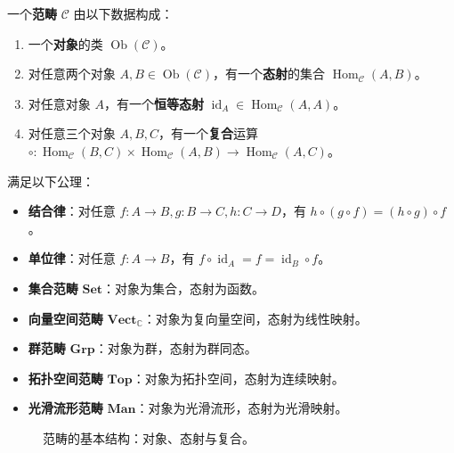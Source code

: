 \begin{definition}[范畴]\label{def:category}
一个\textbf{范畴} $\mathcal{C}$ 由以下数据构成：
\begin{enumerate}[label=(\roman*)]
    \item 一个\textbf{对象}的类 $\operatorname{Ob}(\mathcal{C})$。
    \item 对任意两个对象 $A, B \in \operatorname{Ob}(\mathcal{C})$，有一个\textbf{态射}的集合 $\operatorname{Hom}_{\mathcal{C}}(A, B)$。
    \item 对任意对象 $A$，有一个\textbf{恒等态射} $\operatorname{id}_A \in \operatorname{Hom}_{\mathcal{C}}(A, A)$。
    \item 对任意三个对象 $A, B, C$，有一个\textbf{复合}运算 $\circ: \operatorname{Hom}_{\mathcal{C}}(B, C) \times \operatorname{Hom}_{\mathcal{C}}(A, B) \to \operatorname{Hom}_{\mathcal{C}}(A, C)$。
\end{enumerate}
满足以下公理：
\begin{itemize}
    \item \textbf{结合律}：对任意 $f: A \to B, g: B \to C, h: C \to D$，有 $h \circ (g \circ f) = (h \circ g) \circ f$。
    \item \textbf{单位律}：对任意 $f: A \to B$，有 $f \circ \operatorname{id}_A = f = \operatorname{id}_B \circ f$。
\end{itemize}
\end{definition}

\begin{example}[周期数学中的范畴实例]\label{ex:category_instances}
\begin{itemize}
    \item \textbf{集合范畴} $\mathbf{Set}$：对象为集合，态射为函数。
    \item \textbf{向量空间范畴} $\mathbf{Vect}_{\mathbb{C}}$：对象为复向量空间，态射为线性映射。
    \item \textbf{群范畴} $\mathbf{Grp}$：对象为群，态射为群同态。
    \item \textbf{拓扑空间范畴} $\mathbf{Top}$：对象为拓扑空间，态射为连续映射。
    \item \textbf{光滑流形范畴} $\mathbf{Man}$：对象为光滑流形，态射为光滑映射。
\end{itemize}
\end{example}

\begin{figure}[htbp]
\centering
{}
\caption{范畴的基本结构：对象、态射与复合。}
\label{fig:category_structure}
\end{figure}


